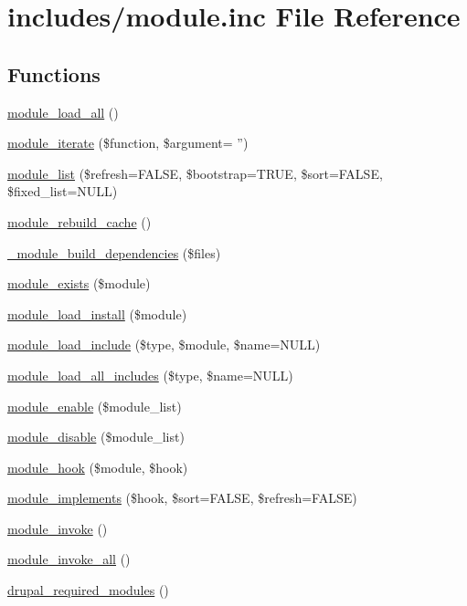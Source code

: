 \hypertarget{module_8inc}{
\section{includes/module.inc File Reference}
\label{module_8inc}
}
\subsection*{Functions}
\begin{CompactItemize}
\item 
\hyperlink{module_8inc_7fcc599da5ee48260c6372b51d28dbe5}{module\_\-load\_\-all} ()
\item 
\hyperlink{module_8inc_11da9b347b2de5df27272537417f6272}{module\_\-iterate} (\$function, \$argument= '')
\item 
\hyperlink{module_8inc_2adef9e0d4a1d838d1bf6a5643bb9ebd}{module\_\-list} (\$refresh=FALSE, \$bootstrap=TRUE, \$sort=FALSE, \$fixed\_\-list=NULL)
\item 
\hyperlink{module_8inc_d906a52cfba472d859805466e64a5312}{module\_\-rebuild\_\-cache} ()
\item 
\hyperlink{module_8inc_4a43fd8278bb4e660eff9a74aaba3dd4}{\_\-module\_\-build\_\-dependencies} (\$files)
\item 
\hyperlink{module_8inc_83bfe4eac372da50ff3eaf949b1b6ff8}{module\_\-exists} (\$module)
\item 
\hyperlink{module_8inc_77a6101f363c066eafbe29b26af5bfd3}{module\_\-load\_\-install} (\$module)
\item 
\hyperlink{module_8inc_49098ed4d33650ee5ab52aab40982423}{module\_\-load\_\-include} (\$type, \$module, \$name=NULL)
\item 
\hyperlink{module_8inc_4e2123e44529b4d307fc1ac78519e966}{module\_\-load\_\-all\_\-includes} (\$type, \$name=NULL)
\item 
\hyperlink{module_8inc_23013c512e0fdb2dacefbe388f713841}{module\_\-enable} (\$module\_\-list)
\item 
\hyperlink{module_8inc_30b7c8c58fd142f2df58e8de113ccd55}{module\_\-disable} (\$module\_\-list)
\item 
\hyperlink{group__hooks_g0d7a0b03039c561b63424b2a6cf6103f}{module\_\-hook} (\$module, \$hook)
\item 
\hyperlink{group__hooks_g55275aa404ced19ade543dec984cb93f}{module\_\-implements} (\$hook, \$sort=FALSE, \$refresh=FALSE)
\item 
\hyperlink{group__hooks_gbd6f189b7bcc74d05755d41ec1dfdfc3}{module\_\-invoke} ()
\item 
\hyperlink{group__hooks_g85e2028954b5e23c5ba2c5f1bd4e3e14}{module\_\-invoke\_\-all} ()
\item 
\hyperlink{module_8inc_029be29693701bd21b6810e8d047c5a8}{drupal\_\-required\_\-modules} ()
\end{CompactItemize}


